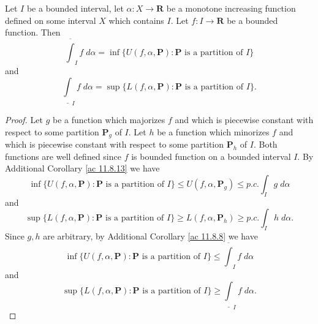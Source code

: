\begin{additional corollary}\label{ac 11.8.14}
Let \(I\) be a bounded interval, let \(\alpha : X \to \mathbf{R}\) be a monotone increasing function defined on some interval \(X\) which contains \(I\).
Let \(f : I \to \mathbf{R}\) be a bounded function.
Then
\[
    \overline{\int}_I f \; d \alpha = \inf\{U(f, \alpha, \mathbf{P}) : \mathbf{P} \text{ is a partition of } I\}
\]
and
\[
    \underline{\int}_I f \; d \alpha = \sup\{L(f, \alpha, \mathbf{P}) : \mathbf{P} \text{ is a partition of } I\}.
\]
\end{additional corollary}

\begin{proof}
    Let \(g\) be a function which majorizes \(f\) and which is piecewise constant with respect to some partition \(\mathbf{P}_g\) of \(I\).
    Let \(h\) be a function which minorizes \(f\) and which is piecewise constant with respect to some partition \(\mathbf{P}_h\) of \(I\).
    Both functions are well defined since \(f\) is bounded function on a bounded interval \(I\).
    By Additional Corollary \ref{ac 11.8.13} we have
    \[
        \inf\big\{U(f, \alpha, \mathbf{P}) : \mathbf{P} \text{ is a partition of } I\big\} \leq U(f, \alpha, \mathbf{P}_g) \leq p.c. \int_I g \; d \alpha
    \]
    and
    \[
        \sup\big\{L(f, \alpha, \mathbf{P}) : \mathbf{P} \text{ is a partition of } I\big\} \geq L(f, \alpha, \mathbf{P}_h) \geq p.c. \int_I h \; d \alpha.
    \]
    Since \(g, h\) are arbitrary, by Additional Corollary \ref{ac 11.8.8} we have
    \[
        \inf\big\{U(f, \alpha, \mathbf{P}) : \mathbf{P} \text{ is a partition of } I\big\} \leq \overline{\int}_I f \; d \alpha
    \]
    and
    \[
        \sup\big\{L(f, \alpha, \mathbf{P}) : \mathbf{P} \text{ is a partition of } I\big\} \geq \underline{\int}_I f \; d \alpha.
    \]


\end{proof}
